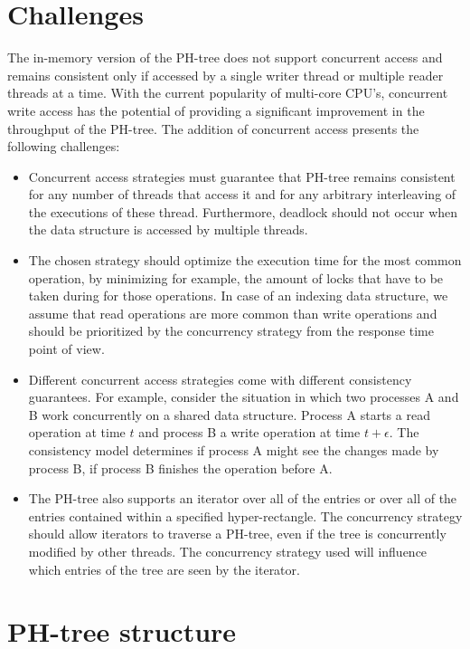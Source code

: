 \documentclass[11pt,a4paper]{globis-book}
\begin{document}
\section{Challenges}
The in-memory version of the PH-tree does not support concurrent access and remains consistent only if accessed by a single writer thread or multiple reader threads at a time. With the current popularity of multi-core CPU's, concurrent write access has the potential of providing a significant improvement in the throughput of the PH-tree. The addition of concurrent access presents the following challenges:
\begin{itemize}
    \item Concurrent access strategies must guarantee that PH-tree remains consistent for any number of threads that access it and for any arbitrary interleaving of the executions of these thread. Furthermore, deadlock should not occur when the data structure is accessed by multiple threads.
    \item The chosen strategy should optimize the execution time for the most common operation, by minimizing for example, the amount of locks that have to be taken during for those operations. In case of an indexing data structure, we assume that read operations are more common than write operations and should be prioritized by the concurrency strategy from the response time point of view.
    \item Different concurrent access strategies come with different consistency guarantees. For example, consider the situation in which two processes A and B work concurrently on a shared data structure. Process A starts a read operation at time $t$ and process B a write operation at time $t + \epsilon$. The consistency model determines if process A might see the changes made by process B, if process B finishes the operation before A.
    \item The PH-tree also supports an iterator over all of the entries or over all of the entries contained within a specified hyper-rectangle. The concurrency strategy should allow iterators to traverse a PH-tree, even if the tree is concurrently modified by other threads. The concurrency strategy used will influence which entries of the tree are seen by the iterator.
\end{itemize}

\section{PH-tree structure}
\end{document}
